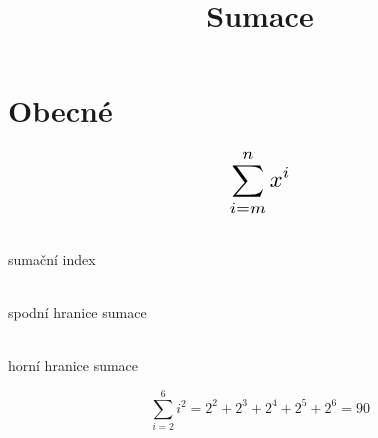 \documentclass[a4paper,11pt]{article}
\title{Sumace}
\begin{document}
\maketitle

\section{Obecné}

\begin{equation}
    \scalebox{1.6}{$
        \displaystyle\sum_{i=m} ^{n} x^i
    $}
\end{equation}

\begin{description}
    \item{}\\
        sumační index
    \item{}\\
        spodní hranice sumace
    \item{}\\
        horní hranice sumace
\end{description}

\begin{equation}
    \displaystyle\sum_{i=2} ^{6} i^2 = 2^2 + 2^3 + 2^4 + 2^5 + 2^6 = 90
\end{equation}
\end{document}
